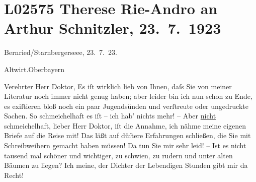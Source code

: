 

\section[Therese Rie-Andro an Arthur Schnitzler, 23. 7. 1923]{L02575 Therese Rie-Andro an Arthur Schnitzler, 23. 7. 1923}
\nopagebreak{}
\rehead{ }\normalsize\beginnumbering{}
\toendnotes[C]{\smallbreak\pagebreak[2]}
\toendnotes[C]{\smallbreak}
\toendnotes[C]{\smallbreak}
\pstart
           \raggedleft{}{\pb}Bernried/Starnbergerseee,
                     23. 7. 23.\pend
           
\pstart
           \raggedleft{}Altwirt.\hspace*{1.5em}Oberbayern\pend
           
\pstart{}Verehrter Herr Doktor,\pend\vspace{0.5em}
\pstart
           Es iſt wirklich lieb von Ihnen, daſs Sie von meiner Literatur noch immer nicht genug
               haben; aber leider bin ich nun schon zu Ende, es exiſtieren bloß noch ein paar
               Jugendsünden und verſtreute oder ungedruckte Sachen. So schmeichelhaft es iſt – ich
               hab’ nichts mehr! – Aber \uline{nicht} schmeichelhaft, lieber
               Herr Doktor, iſt die Annahme, ich nähme meine eigenen Briefe auf die Reise mit! Das
               läßt auf düſtere Erfahrungen schließen, die Sie mit Schreibweibern gemacht haben
               müssen! Da tun Sie mir sehr leid! – Ist es nicht tausend mal schöner und wichtiger,
               zu schwi{\geminationm}en\textcolor{gray}{,} zu rudern und unter alten
               Bäumen zu liegen? Ich meine, der Dichter der Lebendigen Stunden gibt mir da Recht!\pend
           
